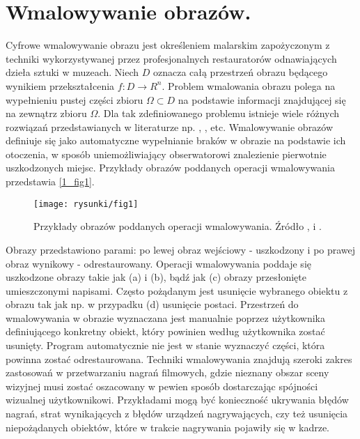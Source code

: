 \documentclass[a4paper,12pt,twoside,openany]{report}
\begin{document}
\section{Wmalowywanie obrazów.}
Cyfrowe wmalowywanie obrazu jest określeniem malarskim zapożyczonym z techniki wykorzystywanej przez profesjonalnych restauratorów odnawiających dzieła sztuki w muzeach. Niech $D$ oznacza całą przestrzeń obrazu będącego wynikiem przekształcenia $f: D \rightarrow R^{n}$. Problem wmalowania obrazu polega na wypełnieniu pustej części zbioru $\Omega \subset D$ na podstawie informacji znajdującej się na zewnątrz zbioru $\Omega$. Dla tak zdefiniowanego problemu istnieje wiele różnych rozwiązań przedstawianych w literaturze np. \cite{SalientStrucTexProp}, \cite{BertalmioNavierStokes}, \cite{arias2011variational} etc. Wmalowywanie obrazów definiuje się jako automatyczne wypełnianie braków w obrazie na podstawie ich otoczenia, w sposób uniemożliwiający obserwatorowi znalezienie pierwotnie uszkodzonych miejsc. Przykłady obrazów poddanych operacji wmalowywania przedstawia \autoref{1_fig1}.
\begin{figure}[!h]
	\centering
	\texttt{[image: rysunki/fig1]}
	\caption{Przykłady obrazów poddanych operacji wmalowywania. Źródło \cite{BertalmioNavierStokes}, \cite{bertalmio2000image} i \cite{patwardhan2007video}.}
	\label{1_fig1}
\end{figure}
Obrazy przedstawiono parami: po lewej obraz wejściowy - uszkodzony i po prawej obraz wynikowy - odrestaurowany. Operacji wmalowywania poddaje się uszkodzone obrazy takie jak (a) i (b), bądź jak (c) obrazy przesłonięte umieszczonymi napisami. Często pożądanym jest usunięcie wybranego obiektu z obrazu tak jak np. w przypadku (d) usunięcie postaci. Przestrzeń do wmalowywania w obrazie wyznaczana jest manualnie poprzez użytkownika definiującego konkretny obiekt, który powinien według użytkownika zostać usunięty. Program automatycznie nie jest w stanie wyznaczyć części, która powinna zostać odrestaurowana. 
Techniki wmalowywania znajdują szeroki zakres zastosowań w przetwarzaniu nagrań filmowych, gdzie nieznany obszar sceny wizyjnej musi zostać oszacowany w pewien sposób dostarczając spójności wizualnej użytkownikowi. Przykładami mogą być konieczność ukrywania błędów nagrań, strat wynikających z błędów urządzeń nagrywających, czy też usunięcia niepożądanych obiektów, które w trakcie nagrywania pojawiły się w kadrze. 
\end{document}
